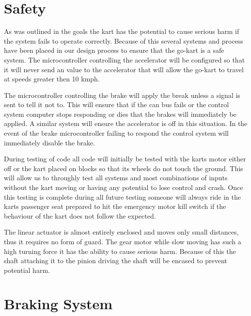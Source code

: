 \section{Safety}

As was outlined in the goals the kart has the potential to cause serious harm if the system fails to operate correctly. Because of this several systems and process have been placed in our design process to ensure that the go-kart is a safe system. The microcontroller controlling the accelerator will be configured so that it will never send an value to the accelerator that will allow the go-kart to travel at speeds greater then 10 kmph.

The microcontroller controlling the brake will apply the break unless a signal is sent to tell it not to. This will ensure that if the can bus fails or the control system computer stops responding or dies that the brakes will immediately be applied. A similar system will ensure the accelerator is off in this situation. In the event of the brake microcontroller failing to respond the control system will immediately disable the brake.

During testing of code all code will initially be tested with the karts motor either off or the kart placed on blocks so that its wheels do not touch the ground. This will allow us to throughly test all systems and most combinations of inputs without the kart moving or having any potential to lose control and crash. Once this testing is complete during all future testing someone will always ride in the karts passenger seat prepared to hit the emergency motor kill switch if the behaviour of the kart does not follow the expected.

The linear actuator is almost entirely enclosed and moves only small distances, thus it requires no form of guard. The gear motor while slow moving has such a high turning force it has the ability to cause serious harm. Because of this the shaft attaching it to the pinion driving the shaft will be encased to prevent potential harm.

\section{Braking System}


